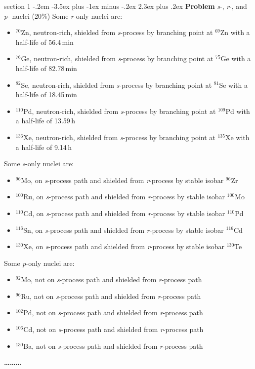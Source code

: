 \documentclass[letterpaper,12pt,twoside=false,DIV=11]{scrartcl}
\makeatletter
\newenvironment{problem}{\@startsection
    {section}
    {1}
    {-.2em}
    {-3.5ex plus -1ex minus -.2ex}
    {2.3ex plus .2ex}
    {
        \pagebreak[3] %
        \noindent\sffamily\bfseries Problem
    }
}
{
    \begin{center}\large\bfseries\ldots\ldots\ldots\end{center}
}
\providecommand{\ex}[1]{\ensuremath{^{#1}}}
\makeatother
\begin{document}
\begin{problem}{\textit{s}-, \textit{r}-, and \textit{p}- nuclei (20\%)}
Some \textit{r}-only nuclei are:
\begin{itemize}
    \item \ex{70}Zn, neutron-rich, shielded from \textit{s}-process by branching point at \ex{69}Zn with a half-life of 56.4\,min
    \item \ex{76}Ge, neutron-rich, shielded from \textit{s}-process by branching point at \ex{75}Ge with a half-life of 82.78\,min
    \item \ex{82}Se, neutron-rich, shielded from \textit{s}-process by branching point at \ex{81}Se with a half-life of 18.45\,min
    \item \ex{110}Pd, neutron-rich, shielded from \textit{s}-process by branching point at \ex{109}Pd with a half-life of 13.59\,h
    \item \ex{136}Xe, neutron-rich, shielded from \textit{s}-process by branching point at \ex{135}Xe with a half-life of 9.14\,h
\end{itemize}

Some \textit{s}-only nuclei are:
\begin{itemize}
    \item \ex{96}Mo, on \textit{s}-process path and shielded from \textit{r}-process by stable isobar \ex{96}Zr
    \item \ex{100}Ru, on \textit{s}-process path and shielded from \textit{r}-process by stable isobar \ex{100}Mo
    \item \ex{110}Cd, on \textit{s}-process path and shielded from \textit{r}-process by stable isobar \ex{110}Pd
    \item \ex{116}Sn, on \textit{s}-process path and shielded from \textit{r}-process by stable isobar \ex{116}Cd
    \item \ex{130}Xe, on \textit{s}-process path and shielded from \textit{r}-process by stable isobar \ex{130}Te
\end{itemize}

Some \textit{p}-only nuclei are:
\begin{itemize}
    \item \ex{92}Mo, not on \textit{s}-process path and shielded from \textit{r}-process path
    \item \ex{96}Ru, not on \textit{s}-process path and shielded from \textit{r}-process path
    \item \ex{102}Pd, not on \textit{s}-process path and shielded from \textit{r}-process path
    \item \ex{106}Cd, not on \textit{s}-process path and shielded from \textit{r}-process path
    \item \ex{130}Ba, not on \textit{s}-process path and shielded from \textit{r}-process path
\end{itemize}
\end{problem}
\end{document}
